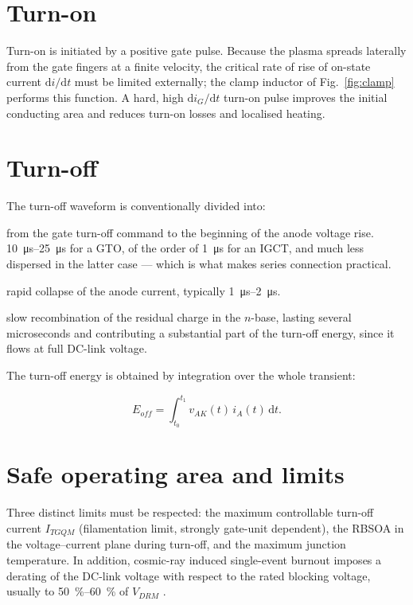 \documentclass[11pt,a4paper]{report}
\begin{document}
\section{Turn-on}

Turn-on is initiated by a positive gate pulse. Because the plasma spreads
laterally from the gate fingers at a finite velocity, the critical rate of rise
of on-state current $\mathrm{d}i/\mathrm{d}t$ must be limited externally; the
clamp inductor of Fig.~\ref{fig:clamp} performs this function. A hard, high
$\mathrm{d}i_{G}/\mathrm{d}t$ turn-on pulse improves the initial conducting area
and reduces turn-on losses and localised heating.

\section{Turn-off}

The turn-off waveform is conventionally divided into:

\begin{description}[nosep]
  \item[Storage time $t_{s}$] from the gate turn-off command to the beginning of
        the anode voltage rise. \SIrange{10}{25}{\micro\second} for a GTO, of the
        order of \SI{1}{\micro\second} for an IGCT, and much less dispersed in
        the latter case --- which is what makes series connection practical.
  \item[Fall time $t_{f}$] rapid collapse of the anode current, typically
        \SIrange{1}{2}{\micro\second}.
  \item[Tail current] slow recombination of the residual charge in the $n$-base,
        lasting several microseconds and contributing a substantial part of the
        turn-off energy, since it flows at full DC-link voltage.
\end{description}

The turn-off energy is obtained by integration over the whole transient:

\begin{equation}
E_{off} = \int_{t_{0}}^{t_{1}} v_{AK}(t)\, i_{A}(t)\, \mathrm{d}t .
\end{equation}

\section{Safe operating area and limits}

Three distinct limits must be respected: the maximum controllable turn-off
current $I_{TGQM}$ (filamentation limit, strongly gate-unit dependent), the RBSOA
in the voltage--current plane during turn-off, and the maximum junction
temperature. In addition, cosmic-ray induced single-event burnout imposes a
derating of the DC-link voltage with respect to the rated blocking voltage,
usually to \SIrange{50}{60}{\percent} of $V_{DRM}$ \cite{abb5sya2033}.
\end{document}
